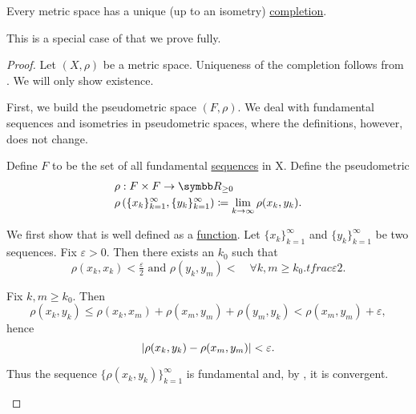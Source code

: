 \begin{theorem}\label{thm:metric_space_completion}
  Every metric space has a unique (up to an isometry) \hyperref[def:complete_metric_space]{completion}.

  This is a special case of  that we prove fully.
\end{theorem}
\begin{proof}
  Let \( (X, \rho) \) be a metric space. Uniqueness of the completion follows from . We will only show existence.

  \begin{ThmEnum}
     First, we build the pseudometric space \( (F, \rho) \). We deal with fundamental sequences and isometries in pseudometric spaces, where the definitions, however, does not change.

    Define \( F \) to be the set of all fundamental \hyperref[def:fundamental_net]{sequences} in X. Define the pseudometric
    \begin{align*}
       & \rho: F \times F \to \BR_{\geq 0}                                                                               \\
       & \rho\left( \{ x_k \}_{k=1}^\infty, \{ y_k \}_{k=1}^\infty \right) \coloneqq \lim_{k \to \infty} \rho(x_k, y_k).
    \end{align*}

    We first show that is well defined as a \hyperref[def:function]{function}. Let \( \{ x_k \}_{k=1}^\infty \) and \( \{ y_k \}_{k=1}^\infty \) be two sequences. Fix \( \varepsilon > 0 \). Then there exists an \( k_0 \) such that
    \begin{equation*}
      \rho(x_k, x_k) < \tfrac \varepsilon 2 \text{ and } \rho(y_k, y_m) <  \quad\forall k, m \geq k_0.tfrac \varepsilon 2.
    \end{equation*}

    Fix \( k, m \geq k_0 \). Then
    \begin{equation*}
      \rho(x_k, y_k) \leq \rho(x_k, x_m) + \rho(x_m, y_m) + \rho(y_m, y_k) < \rho(x_m, y_m) + \varepsilon,
    \end{equation*}
    hence
    \begin{equation*}
      \left\vert \rho(x_k, y_k) - \rho(x_m, y_m) \right\vert < \varepsilon.
    \end{equation*}

    Thus the sequence \( \{ \rho(x_k, y_k) \}_{k=1}^\infty \) is fundamental and, by , it is convergent.


\end{ThmEnum}
\end{proof}
